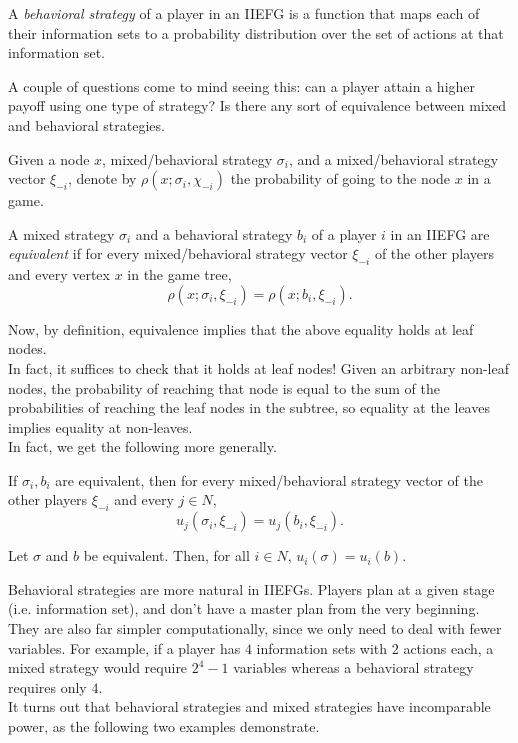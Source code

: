 		\begin{fdef}
			A \emph{behavioral strategy} of a player in an IIEFG is a function that maps each of their information sets to a probability distribution over the set of actions at that information set.
		\end{fdef}

		A couple of questions come to mind seeing this: can a player attain a higher payoff using one type of strategy? Is there any sort of equivalence between mixed and behavioral strategies.

		Given a node $x$, mixed/behavioral strategy $\sigma_i$, and a mixed/behavioral strategy vector $\xi_{-i}$, denote by $\rho(x;\sigma_i,\chi_{-i})$ the probability of going to the node $x$ in a game.
		\begin{fdef}
			A mixed strategy $\sigma_i$ and a behavioral strategy $b_i$ of a player $i$ in an IIEFG are \emph{equivalent} if for every mixed/behavioral strategy vector $\xi_{-i}$ of the other players and every vertex $x$ in the game tree,
			\[ \rho(x;\sigma_i,\xi_{-i}) = \rho(x;b_i,\xi_{-i}). \]
		\end{fdef}


		Now, by definition, equivalence implies that the above equality holds at leaf nodes.\\
		In fact, it suffices to check that it holds at leaf nodes! Given an arbitrary non-leaf nodes, the probability of reaching that node is equal to the sum of the probabilities of reaching the leaf nodes in the subtree, so equality at the leaves implies equality at non-leaves.\\
		In fact, we get the following more generally.

		\begin{ftheo}
			If $\sigma_i,b_i$ are equivalent, then for every mixed/behavioral strategy vector of the other players $\xi_{-i}$ and every $j \in N$,
			\[ u_j(\sigma_i,\xi_{-i}) = u_j(b_i,\xi_{-i}). \]
		\end{ftheo}
		\begin{fcor}
			Let $\sigma$ and $b$ be equivalent. Then, for all $i \in N$, $u_i(\sigma) = u_i(b)$.
		\end{fcor}

		Behavioral strategies are more natural in IIEFGs. Players plan at a given stage (i.e. information set), and don't have a master plan from the very beginning. They are also far simpler computationally, since we only need to deal with fewer variables. For example, if a player has $4$ information sets with $2$ actions each, a mixed strategy would require $2^4-1$ variables whereas a behavioral strategy requires only $4$.\\
		It turns out that behavioral strategies and mixed strategies have incomparable power, as the following two examples demonstrate. 

